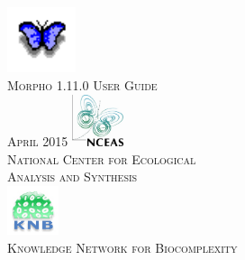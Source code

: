 \documentclass[11pt]{article}
\begin{document}
  \pagestyle{empty}

  \begin{titlepage}
    \begin{center}
    \includegraphics[width=2cm]{images/logo-morpho.png}\\[0.5cm]
    \textsc{\LARGE Morpho 1.11.0 User Guide}\\[1cm]
    \textsc{April 2015}
    \vfill
    \includegraphics[width=1.5cm]{images/logo-nceas.jpg}\\[0.5cm]
    \textsc{National Center for Ecological\\Analysis and Synthesis}\\[1cm]
    \includegraphics[width=1.5cm]{images/logo-knb.jpg}\\[0.2cm]
    \textsc{Knowledge Network for Biocomplexity}
    \end{center}
  \end{titlepage}
  \pagebreak

  \tableofcontents
  \pagebreak

  
    \setcounter{figure}{0} 
  
    \setcounter{figure}{0} 
  
    \setcounter{figure}{0} 
  
    \setcounter{figure}{0} 
  
    \setcounter{figure}{0} 
  
    \setcounter{figure}{0} 
  
    \setcounter{figure}{0} 
  
    \setcounter{figure}{0} 
  
    \setcounter{figure}{0} 
  
    \setcounter{figure}{0} 
  
    \setcounter{figure}{0} 
  
    \setcounter{figure}{0} 
  

\end{document}

